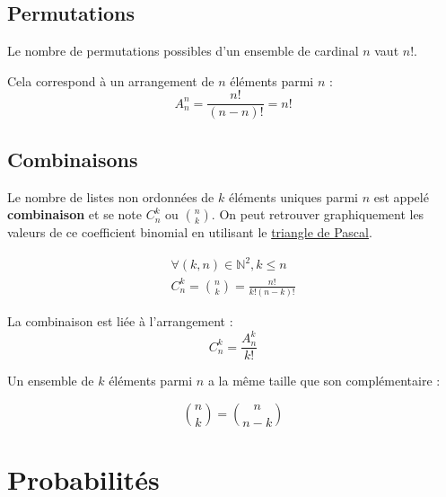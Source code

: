 \subsection{Permutations}

Le nombre de permutations possibles d'un ensemble de cardinal $n$ vaut $n!$.

\begin{remarque}
	Cela correspond à un arrangement de $n$ éléments parmi $n$ :
	\begin{equation*}
		A^n_n = \frac{n!}{(n-n)!} = n!
	\end{equation*}
\end{remarque}

\subsection{Combinaisons}

Le nombre de listes non ordonnées de $k$ éléments uniques parmi $n$ est appelé \textbf{combinaison} et se note $C^k_n$ ou $\binom{n}{k}$. On peut retrouver graphiquement les valeurs de ce coefficient binomial en utilisant le \href{https://en.wikipedia.org/wiki/Pascal%27s_triangle}{triangle de Pascal}.

\begin{definition}
	\begin{equation*}
		\begin{split}
			\forall (k,n) \in \mathbb{N}^2, k \le n \\
			C^k_n = \binom{n}{k} = \frac{n!}{k!(n-k)!}
		\end{split}
	\end{equation*}
\end{definition}

\begin{remarque}
	La combinaison est liée à l'arrangement :
	\begin{equation*}
		C^k_n = \frac{A^k_n}{k!}
	\end{equation*}
\end{remarque}

\begin{remarque}
	Un ensemble de $k$ éléments parmi $n$ a la même taille que son complémentaire :

	\begin{equation*}
		\binom{n}{k} = \binom{n}{n-k}
	\end{equation*}
\end{remarque}

\section{Probabilités}